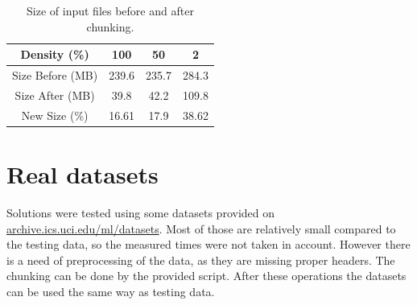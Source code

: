 \begin{table}
\centering
\begin{tabular} {| c | c | c | c |}

\hline
Density (\%) & 100 & 50 & 2 \\
\hline
Size Before (MB) & 239.6 & 235.7 & 284.3 \\
\hline
Size After (MB) & 39.8 & 42.2 & 109.8 \\
\hline
\hline
New Size (\%) & 16.61 & 17.9 & 38.62  \\
\hline
\end{tabular}
\caption{Size of input files before and after chunking.}
\label{tab_chunk}
\end{table}

\section{Real datasets}
Solutions were tested using some datasets provided on \url{archive.ics.uci.edu/ml/datasets}. Most of those are relatively small compared to the testing data, so the measured times were not taken in account. However there is a need of preprocessing of the data, as they are missing proper headers. The chunking can be done by the provided script. After these operations the datasets can be used the same way as testing data.
